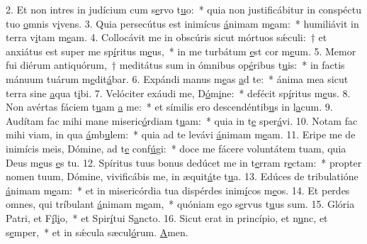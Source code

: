 2. Et non intres in judícium cum s\uline{e}rvo t\uline{u}o:~* quia non justificábitur in conspéctu tuo \uline{o}mnis v\uline{i}vens.
3. Quia persecútus est inimícus \uline{á}nimam m\uline{e}am:~* humiliávit in terra v\uline{i}tam m\uline{e}am.
4. Collocávit me in obscúris sicut mórtuos sǽculi:~† et anxiátus est super me sp\uline{í}ritus m\uline{e}us,~* in me turbátum \uline{e}st cor m\uline{e}um.
5. Memor fui diérum antiquórum,~† meditátus sum in ómnibus op\uline{é}ribus t\uline{u}is:~* in factis mánuum tuárum m\uline{e}dit\uline{á}bar.
6. Expándi manus m\uline{e}as \uline{a}d te:~* ánima mea sicut terra sine \uline{a}qua t\uline{i}bi.
7. Velóciter exáudi me, D\uline{ó}m\uline{i}ne:~* defécit sp\uline{í}ritus m\uline{e}us.
8. Non avértas fáciem t\uline{u}am \uline{a} me:~* et símilis ero descendéntib\uline{u}s in l\uline{a}cum.
9. Audítam fac mihi mane miseric\uline{ó}rdiam t\uline{u}am:~* quia in t\uline{e} sper\uline{á}vi.
10. Notam fac mihi viam, in qua \uline{á}mb\uline{u}lem:~* quia ad te levávi \uline{á}nimam m\uline{e}am.
11. Eripe me de inimícis meis, Dómine, ad t\uline{e} conf\uline{ú}gi:~* doce me fácere voluntátem tuam, quia Deus m\uline{e}us \uline{e}s tu.
12. Spíritus tuus bonus dedúcet me in t\uline{e}rram r\uline{e}ctam:~* propter nomen tuum, Dómine, vivificábis me, in æquit\uline{á}te t\uline{u}a.
13. Edúces de tribulatióne \uline{á}nimam m\uline{e}am:~* et in misericórdia tua dispérdes inim\uline{í}cos m\uline{e}os.
14. Et perdes omnes, qui tríbulant \uline{á}nimam m\uline{e}am,~* quóniam ego s\uline{e}rvus t\uline{u}us sum.
15. Glória Patri, et F\uline{í}l\uline{i}o,~* et Spir\uline{í}tui S\uline{a}ncto.
16. Sicut erat in princípio, et n\uline{u}nc, et s\uline{e}mper,~* et in sǽcula sæcul\uline{ó}rum. \uline{A}men.
